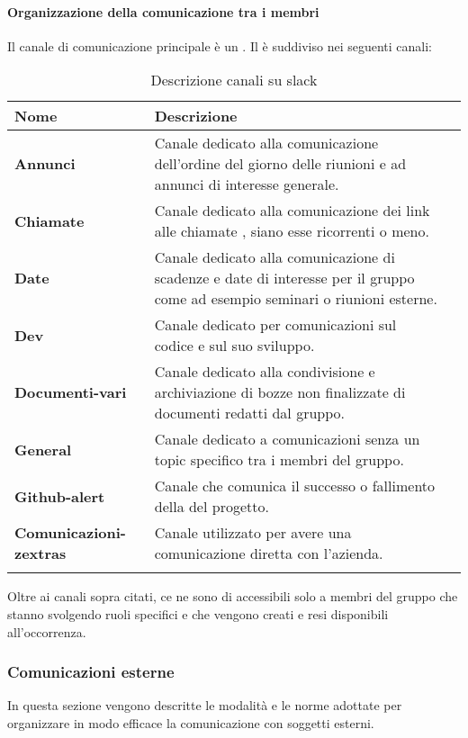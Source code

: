 \paragraph*{Organizzazione della comunicazione tra i membri }
Il canale di comunicazione principale è un  .
Il  è suddiviso nei seguenti canali:

\setlength{\freewidth}{\dimexpr\textwidth-0\tabcolsep}
	\renewcommand{\arraystretch}{1.5}
	\setlength{\aboverulesep}{0pt}
	\setlength{\belowrulesep}{0pt}
	\begin{longtable}{L{.210\freewidth} L{.6\freewidth} L{.080\freewidth}}
		\textbf{Nome} & \textbf{Descrizione} \\
		\toprule
		\endhead		
		\textbf{Annunci} & Canale dedicato alla comunicazione dell'ordine del giorno delle riunioni e ad annunci di interesse generale. \\
		\textbf{Chiamate} & Canale dedicato alla comunicazione dei link alle chiamate , siano esse ricorrenti o meno. \\
		 \textbf{Date} & Canale dedicato alla comunicazione di scadenze e date di interesse per il gruppo come ad esempio seminari o riunioni esterne. \\
		 \textbf{Dev} & Canale dedicato per comunicazioni sul codice e sul suo sviluppo. \\
		\textbf{Documenti-vari} & Canale dedicato alla condivisione e archiviazione di bozze non finalizzate di documenti redatti dal gruppo. \\
		 \textbf{General} & Canale dedicato a comunicazioni senza un topic specifico tra i membri del gruppo. \\
		 \textbf{Github-alert} & Canale che comunica il successo o fallimento della  del progetto. \\
		 \textbf{Comunicazioni-zextras} & Canale utilizzato per avere una comunicazione diretta con l'azienda. \\
		\bottomrule
		\hiderowcolors
		\caption{Descrizione canali su slack}
	\end{longtable}
Oltre ai canali sopra citati, ce ne sono di accessibili solo a membri del gruppo che stanno svolgendo ruoli specifici e che vengono creati e resi disponibili all'occorrenza.
\subsubsection{Comunicazioni esterne}
In questa sezione vengono descritte le modalità e le norme adottate per organizzare in modo efficace la comunicazione con soggetti esterni.
